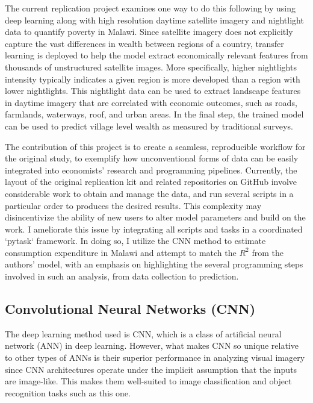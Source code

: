 \documentclass[11pt, a4paper, leqno]{article}
\begin{document}
The current replication project examines one way to do this following \citet{jean2016combining} by using deep learning along with high resolution daytime satellite imagery and nightlight data to quantify poverty in Malawi. Since satellite imagery does not explicitly capture the vast differences in wealth between regions of a country, transfer learning is deployed to help the model extract economically relevant features from thousands of unstructured satellite images. More specifically, higher nightlights intensity typically indicates a given region is more developed than a region with lower nightlights. This nightlight data can be used to extract landscape features in daytime imagery that are correlated with economic outcomes, such as roads, farmlands, waterways, roof, and urban areas. In the final step, the trained model can be used to predict village level wealth as measured by traditional surveys. 

The contribution of this project is to create a seamless, reproducible workflow for the original study, to exemplify how unconventional forms of data can be easily integrated into economists' research and programming pipelines. Currently, the layout of the original replication kit and related repositories on GitHub involve considerable work to obtain and manage the data, and run several scripts in a particular order to produces the desired results. This complexity may disincentivize the ability of new users to alter model parameters and build on the work. I ameliorate this issue by integrating all scripts and tasks in a coordinated `pytask` framework. In doing so, I utilize the CNN method to estimate consumption expenditure in Malawi and attempt to match the $R^2$ from the authors' model, with an emphasis on highlighting the several programming steps involved in such an analysis, from data collection to prediction. 

\subsection{Convolutional Neural Networks (CNN)}

The deep learning method used is CNN, which is a class of artificial neural network (ANN) in deep learning. However, what makes CNN so unique relative to other types of ANNs is their superior performance in analyzing visual imagery since CNN architectures operate under the implicit assumption that the inputs are image-like. This makes them well-suited to image classification and object recognition tasks such as this one.
\end{document}
